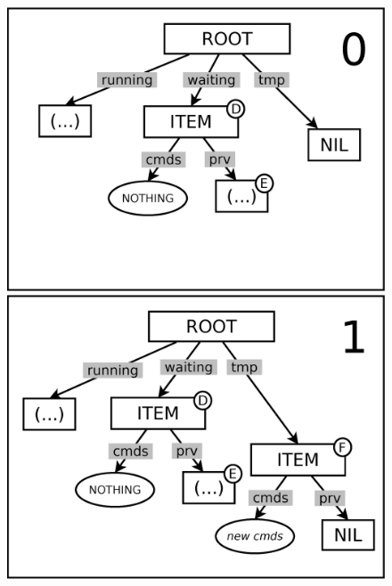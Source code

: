 \documentclass{sig-alternate}
\begin{document}
\begin{figure}[t]
\begin{minipage}[t]{0.99\linewidth}
\centering
\includegraphics[scale=0.23]{queue-20.eps}
\end{minipage}

\begin{minipage}[t]{0.99\linewidth}
\centering
\includegraphics[scale=0.23]{queue-21.eps}
\end{minipage}


\end{figure}
\end{document}
